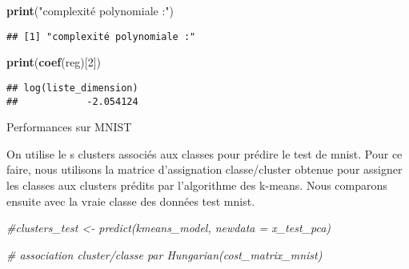 \documentclass[
  ignorenonframetext,
]{beamer}
\newenvironment{Shaded}{\begin{snugshade}}{\end{snugshade}}
\newcommand{\CommentTok}[1]{\textcolor[rgb]{0.56,0.35,0.01}{\textit{#1}}}
\newcommand{\DecValTok}[1]{\textcolor[rgb]{0.00,0.00,0.81}{#1}}
\newcommand{\FunctionTok}[1]{\textcolor[rgb]{0.13,0.29,0.53}{\textbf{#1}}}
\newcommand{\NormalTok}[1]{#1}
\newcommand{\StringTok}[1]{\textcolor[rgb]{0.31,0.60,0.02}{#1}}
\begin{document}
\begin{frame}[fragile]{}
\begin{Shaded}
\begin{Highlighting}[]
\FunctionTok{print}\NormalTok{(}\StringTok{"complexité polynomiale :"}\NormalTok{)}
\end{Highlighting}
\end{Shaded}

\begin{verbatim}
## [1] "complexité polynomiale :"
\end{verbatim}

\begin{Shaded}
\begin{Highlighting}[]
\FunctionTok{print}\NormalTok{(}\FunctionTok{coef}\NormalTok{(reg)[}\DecValTok{2}\NormalTok{])}
\end{Highlighting}
\end{Shaded}

\begin{verbatim}
## log(liste_dimension) 
##            -2.054124
\end{verbatim}
\end{frame}

\begin{frame}[fragile]{}
\protect\hypertarget{section-16}{}
Performances sur MNIST

On utilise le s clusters associés aux classes pour prédire le test de
mnist. Pour ce faire, nous utilisons la matrice d'assignation
classe/cluster obtenue pour assigner les classes aux clusters prédits
par l'algorithme des k-means. Nous comparons ensuite avec la vraie
classe des données test mnist.

\begin{Shaded}
\begin{Highlighting}[]
\CommentTok{\#clusters\_test \textless{}{-} predict(kmeans\_model, newdata = x\_test\_pca)}

\CommentTok{\# association cluster/classe par Hungarian(cost\_matrix\_mnist)}
\end{Highlighting}
\end{Shaded}
\end{frame}
\end{document}
